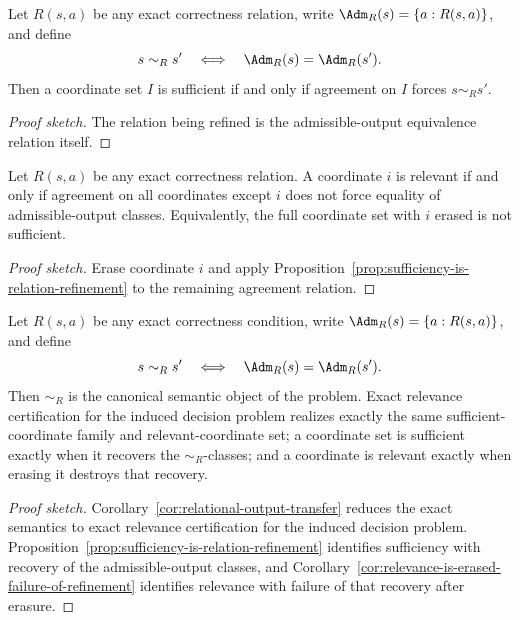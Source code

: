 \begin{proposition}\label{prop:sufficiency-is-relation-refinement}
Let $R(s,a)$ be any exact correctness relation, write $\Adm_R(s)=\{a : R(s,a)\}$, and define
\[
s \sim_R s' \quad\Longleftrightarrow\quad \Adm_R(s)=\Adm_R(s').
\]
Then a coordinate set $I$ is sufficient if and only if agreement on $I$ forces $s \sim_R s'$.
\end{proposition}

\begin{proof}[Proof sketch]
The relation being refined is the admissible-output equivalence relation itself.
\end{proof}

\begin{corollary}\label{cor:relevance-is-erased-failure-of-refinement}
Let $R(s,a)$ be any exact correctness relation. A coordinate $i$ is relevant if and only if agreement on all coordinates except $i$ does not force equality of admissible-output classes. Equivalently, the full coordinate set with $i$ erased is not sufficient.
\end{corollary}

\begin{proof}[Proof sketch]
Erase coordinate $i$ and apply Proposition~\ref{prop:sufficiency-is-relation-refinement} to the remaining agreement relation.
\end{proof}

\begin{theorem}\label{thm:exact-semantics-quotient-universality}
Let $R(s,a)$ be any exact correctness condition, write $\Adm_R(s)=\{a : R(s,a)\}$, and define
\[
s \sim_R s' \quad\Longleftrightarrow\quad \Adm_R(s)=\Adm_R(s').
\]
Then $\sim_R$ is the canonical semantic object of the problem. Exact relevance certification for the induced decision problem realizes exactly the same sufficient-coordinate family and relevant-coordinate set; a coordinate set is sufficient exactly when it recovers the $\sim_R$-classes; and a coordinate is relevant exactly when erasing it destroys that recovery.
\end{theorem}

\begin{proof}[Proof sketch]
Corollary~\ref{cor:relational-output-transfer} reduces the exact semantics to exact relevance certification for the induced decision problem. Proposition~\ref{prop:sufficiency-is-relation-refinement} identifies sufficiency with recovery of the admissible-output classes, and Corollary~\ref{cor:relevance-is-erased-failure-of-refinement} identifies relevance with failure of that recovery after erasure.
\end{proof}

